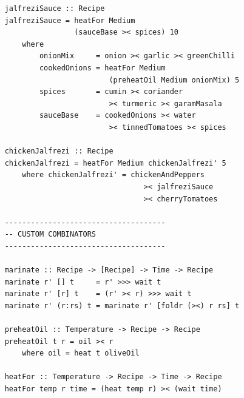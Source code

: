 \documentclass[11pt]{article}
\begin{document}
\begin{tt}
\begin{lstlisting}
    jalfreziSauce :: Recipe
    jalfreziSauce = heatFor Medium
                    (sauceBase >< spices) 10
        where
            onionMix     = onion >< garlic >< greenChilli
            cookedOnions = heatFor Medium
                            (preheatOil Medium onionMix) 5
            spices       = cumin >< coriander
                            >< turmeric >< garamMasala
            sauceBase    = cookedOnions >< water
                            >< tinnedTomatoes >< spices
    
    chickenJalfrezi :: Recipe
    chickenJalfrezi = heatFor Medium chickenJalfrezi' 5
        where chickenJalfrezi' = chickenAndPeppers
                                    >< jalfreziSauce
                                    >< cherryTomatoes
    
    -------------------------------------
    -- CUSTOM COMBINATORS
    -------------------------------------
    
    marinate :: Recipe -> [Recipe] -> Time -> Recipe
    marinate r' [] t     = r' >>> wait t
    marinate r' [r] t    = (r' >< r) >>> wait t
    marinate r' (r:rs) t = marinate r' [foldr (><) r rs] t
    
    preheatOil :: Temperature -> Recipe -> Recipe
    preheatOil t r = oil >< r
        where oil = heat t oliveOil
    
    heatFor :: Temperature -> Recipe -> Time -> Recipe
    heatFor temp r time = (heat temp r) >< (wait time)
    \end{lstlisting}
    \end{tt}
\end{document}
